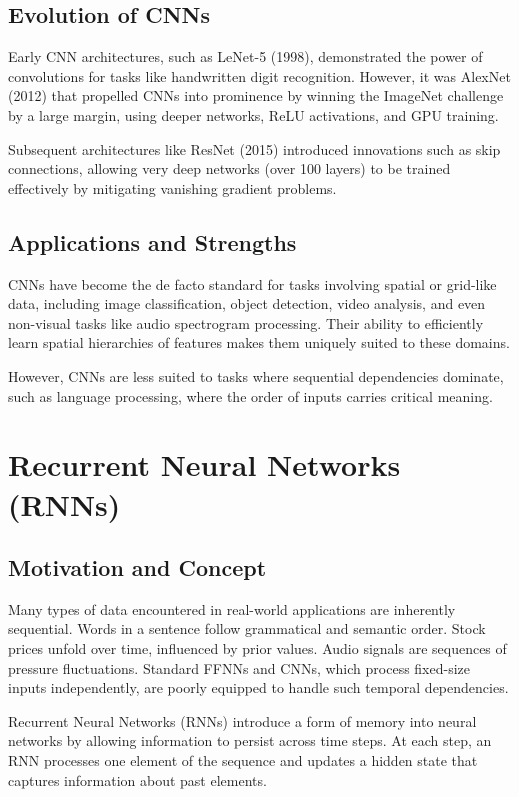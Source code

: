 \documentclass{book}
\begin{document}
\subsection{Evolution of CNNs}

Early CNN architectures, such as LeNet-5 (1998), demonstrated the power of 
convolutions for tasks like handwritten digit recognition. However, it was 
AlexNet (2012) that propelled CNNs into prominence by winning the ImageNet 
challenge by a large margin, using deeper networks, ReLU activations, and GPU 
training.

Subsequent architectures like ResNet (2015) introduced innovations such as skip 
connections, allowing very deep networks (over 100 layers) to be trained 
effectively by mitigating vanishing gradient problems.

\subsection{Applications and Strengths}

CNNs have become the de facto standard for tasks involving spatial or grid-like 
data, including image classification, object detection, video analysis, and even
non-visual tasks like audio spectrogram processing. Their ability to efficiently 
learn spatial hierarchies of features makes them uniquely suited to these 
domains.

However, CNNs are less suited to tasks where sequential dependencies dominate, 
such as language processing, where the order of inputs carries critical meaning.

\section{Recurrent Neural Networks (RNNs)}

\subsection{Motivation and Concept}

Many types of data encountered in real-world applications are inherently 
sequential. Words in a sentence follow grammatical and semantic order. Stock 
prices unfold over time, influenced by prior values. Audio signals are sequences
 of pressure fluctuations. Standard FFNNs and CNNs, which process fixed-size 
 inputs independently, are poorly equipped to handle such temporal dependencies.

Recurrent Neural Networks (RNNs) introduce a form of memory into neural networks 
by allowing information to persist across time steps. At each step, an RNN 
processes one element of the sequence and updates a hidden state that captures 
information about past elements.
\end{document}
